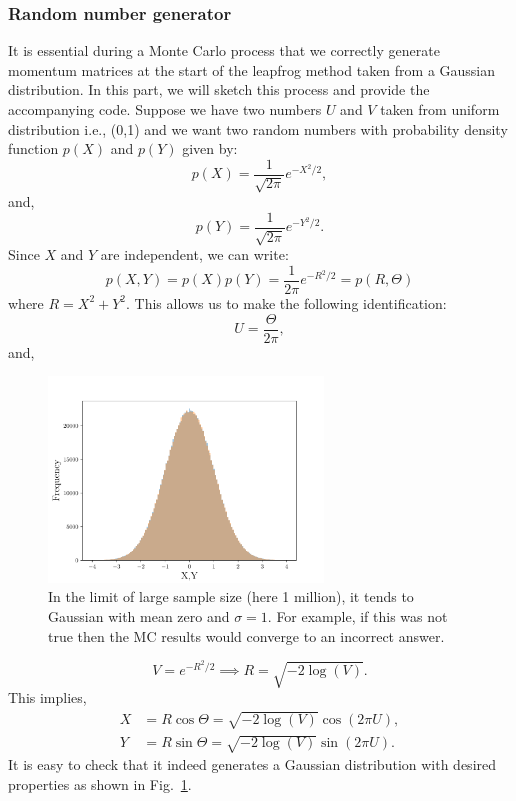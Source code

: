 \documentclass[letter,11pt]{article}
\begin{document}
\subsubsection{Random number generator}  
It is essential during a Monte Carlo process that we correctly generate momentum matrices at the start of the leapfrog method taken from a Gaussian distribution. In this part, we will sketch this process and provide the accompanying code. 
Suppose we have two numbers $U$ and $V$ taken from uniform distribution i.e., (0,1) 
and we want two random numbers with probability density function $p(X)$ and $p(Y)$ given by:
\begin{equation}
	p(X) = \frac{1}{\sqrt{2\pi}} e^{-X^2/2}, 
\end{equation}
and, 
\begin{equation}
	p(Y) = \frac{1}{\sqrt{2\pi}} e^{-Y^2/2} .
\end{equation}
Since $X$ and $Y$ are independent, we can write:
\begin{equation}
	p(X,Y) = p(X) p(Y) = \frac{1}{2\pi} e^{-R^2/2} = p(R, \Theta) 
\end{equation}
where $R = X^2 + Y^2$. This allows us to make the following identification:
\begin{equation}
	U = \frac{\Theta}{2\pi}, 
\end{equation}
and, 

\begin{figure}[htbp] 
	\centering 
	\includegraphics[width=0.65\textwidth]{figs/testRN.pdf}
	\caption{\label{fig:RN}In the limit of large sample size (here 1 million), 
	it tends to Gaussian with mean zero and $\sigma=1$. For example, if 
	this was not true then the MC results would converge to an incorrect answer.}
\end{figure}
\begin{equation}
	V = e^{-R^2/2} \implies R = \sqrt{-2 \log(V)}. 
\end{equation}
This implies, 
\begin{align}
	X &= R \cos \Theta = \sqrt{-2 \log(V)} \cos(2 \pi U), \\
	Y &= R \sin \Theta = \sqrt{-2 \log(V)} \sin(2 \pi U).
\end{align}
It is easy to check that it indeed generates a 
Gaussian distribution with desired properties as shown in Fig.~\ref{fig:RN}. 
\end{document}
